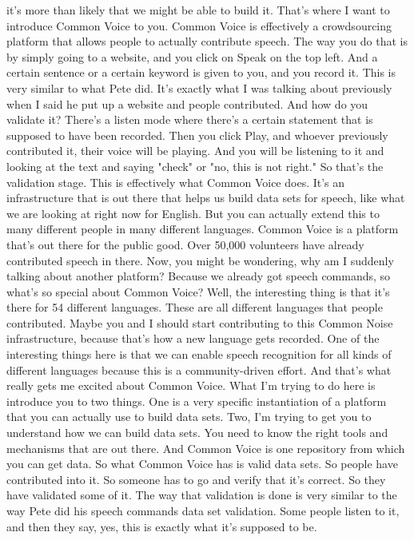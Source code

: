 it's more than likely that we might be able to build it.
That's where I want to introduce Common Voice to you.
Common Voice is effectively a crowdsourcing platform
that allows people to actually contribute speech.
The way you do that is by simply going to a website,
and you click on Speak on the top left.
And a certain sentence or a certain keyword is given to you,
and you record it.
This is very similar to what Pete did.
It's exactly what I was talking about previously when I said he put up
a website and people contributed.
And how do you validate it?
There's a listen mode where there's a certain statement that
is supposed to have been recorded.
Then you click Play, and whoever previously contributed it,
their voice will be playing.
And you will be listening to it and looking at the text
and saying "check" or "no, this is not right."
So that's the validation stage.
This is effectively what Common Voice does.
It's an infrastructure that is out there that
helps us build data sets for speech, like what we are looking at right now
for English.
But you can actually extend this to many different people
in many different languages.
Common Voice is a platform that's out there for the public good.
Over 50,000 volunteers have already contributed speech in there.
Now, you might be wondering, why am I suddenly talking
about another platform?
Because we already got speech commands, so
what's so special about Common Voice?
Well, the interesting thing is that it's there for 54 different languages.
These are all different languages that people contributed.
Maybe you and I should start contributing to this Common Noise
infrastructure, because that's how a new language gets recorded.
One of the interesting things here is that we can enable speech recognition
for all kinds of different languages because this
is a community-driven effort.
And that's what really gets me excited about Common Voice.
What I'm trying to do here is introduce you to two things.
One is a very specific instantiation of a platform
that you can actually use to build data sets.
Two, I'm trying to get you to understand how we can build data sets.
You need to know the right tools and mechanisms that are out there.
And Common Voice is one repository from which you can get data.
So what Common Voice has is valid data sets.
So people have contributed into it.
So someone has to go and verify that it's correct.
So they have validated some of it.
The way that validation is done is very similar to the way
Pete did his speech commands data set validation.
Some people listen to it, and then they say, yes, this
is exactly what it's supposed to be.
